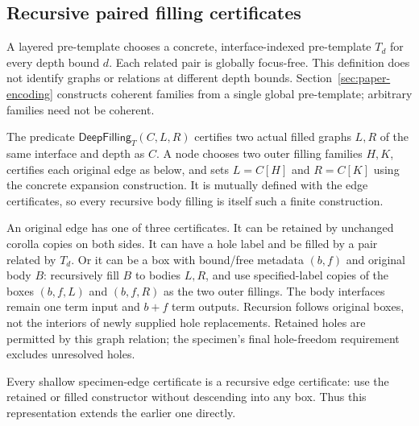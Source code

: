 \clearpage
\subsection{Recursive paired filling certificates}
\begin{definition}\label{term:layered-template}
A layered pre-template chooses a concrete, interface-indexed pre-template
$T_d$ for every depth bound $d$. Each related pair is globally focus-free.
This definition does not identify graphs or relations at different
depth bounds. Section~\ref{sec:paper-encoding} constructs coherent families
from a single global pre-template; arbitrary families need not be coherent.
\end{definition}

\begin{definition}\label{term:deep-filling}
The predicate $\mathsf{DeepFilling}_T(C,L,R)$ certifies two actual filled
graphs $L,R$ of the same interface and depth as $C$. A node chooses two
outer filling families $H,K$, certifies each original edge as below,
and sets $L=C[H]$ and $R=C[K]$ using the concrete expansion construction.
It is mutually defined with the edge certificates, so every recursive
body filling is itself such a finite construction.
\end{definition}

\begin{definition}\label{term:deep-filling-edge}
An original edge has one of three certificates.
It can be retained by unchanged corolla copies on both sides.
It can have a hole label and be filled by a pair related by $T_d$.
Or it can be a box with bound/free metadata $(b,f)$ and original body
$B$: recursively fill $B$ to bodies $L,R$, and use specified-label
copies of the boxes $(b,f,L)$ and $(b,f,R)$ as the two outer fillings.
The body interfaces remain one term input and $b+f$ term outputs.
Recursion follows original boxes, not the interiors of newly supplied
hole replacements. Retained holes are permitted by this graph relation;
the specimen's final hole-freedom requirement excludes unresolved holes.
\end{definition}

Every shallow specimen-edge certificate is a recursive edge certificate:
use the retained or filled constructor without descending into any box.
Thus this representation extends the earlier one directly.

